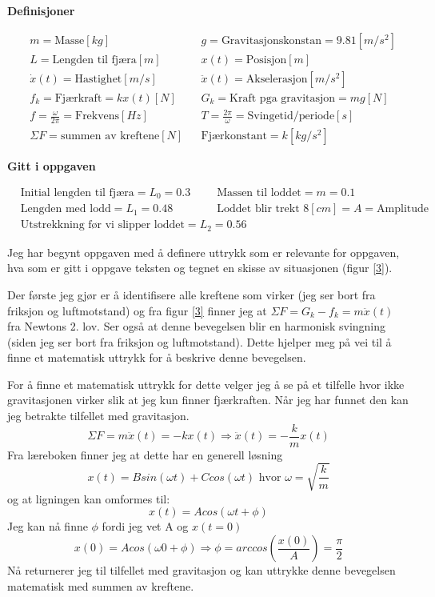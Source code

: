 \documentclass[a4paper,12pt,norsk]{article}
\begin{document}
\begin{center}
\textbf{Definisjoner}
\end{center}
\begin{align*}
&m = \text{Masse}[kg] && g = \text{Gravitasjonskonstan} = 9.81[m/s^2]\\
&L = \text{Lengden til fjæra}[m] && x(t) = \text{Posisjon}[m]\\
&\dot{x}(t) = \text{Hastighet}[m/s] && \ddot{x}(t) = \text{Akselerasjon}[m/s^2] \\
&f_k = \text{Fjærkraft} = kx(t)[N] && G_k = \text{Kraft pga gravitasjon} = mg[N]\\
& f = \frac{\omega}{2\pi}=\text{Frekvens}[Hz] && T = \frac{2\pi}{\omega}=\text{Svingetid/periode}[s]\\
&\Sigma F = \text{summen av kreftene}[N] && \text{Fjærkonstant} = k[kg/s^2]
\end{align*}
\begin{center}
\textbf{Gitt i oppgaven}
\end{center}
\begin{align*}
&\text{Initial lengden til fjæra} = L_0 = 0.3 && \text{Massen til loddet} = m = 0.1  \\
&\text{Lengden med lodd}= L_1 = 0.48  && \text{Loddet blir trekt } 8[cm] = A = \text{Amplitude}\\
&\text{Utstrekkning før vi slipper loddet}=L_2 = 0.56
\end{align*}

Jeg har begynt oppgaven med å definere uttrykk som er relevante for oppgaven, hva som er gitt i oppgave teksten og tegnet en skisse av situasjonen (figur \vref{3}).

Der første jeg gjør er å identifisere alle kreftene som virker (jeg ser bort fra friksjon og luftmotstand) og fra figur \ref{3} finner jeg at $\Sigma F = G_k -f_k = m\ddot{x}(t)$ fra Newtons 2. lov. Ser også at denne bevegelsen blir en harmonisk svingning (siden jeg ser bort fra friksjon og luftmotstand). Dette hjelper meg på vei til å finne et matematisk uttrykk for å beskrive denne bevegelsen. 

For å finne et matematisk uttrykk for dette velger jeg å se på et tilfelle hvor ikke gravitasjonen virker slik at jeg kun finner fjærkraften. Når jeg har funnet den kan jeg betrakte tilfellet med gravitasjon. 
$$
\Sigma F = m\ddot{x}(t) = - kx(t)\Rightarrow \ddot{x}(t) = -\frac{k}{m}x(t)
$$
Fra læreboken finner jeg at dette har en generell løsning
$$
x(t) = Bsin(\omega t) + Ccos(\omega t) \text{ hvor } \omega = \sqrt{\frac{k}{m}}
$$
og at ligningen kan omformes til:
$$
x(t) = Acos(\omega t + \phi)
$$ 
Jeg kan nå finne $\phi$ fordi jeg vet A og $x(t=0)$ 
$$ 
x(0) = Acos(\omega 0 + \phi) \Rightarrow \phi = arccos\left( \frac{x(0)}{A} \right) = \frac{\pi}{2}
$$
Nå returnerer jeg til tilfellet med gravitasjon og kan uttrykke denne bevegelsen matematisk med summen av kreftene.
\end{document}

